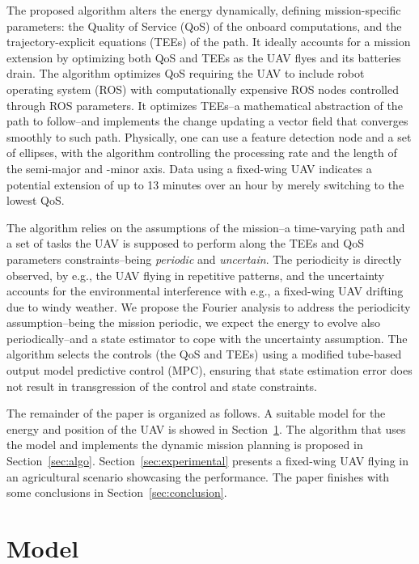 \documentclass[letterpaper,10pt,conference]{ieeeconf}
\begin{document}
The proposed algorithm alters the energy dynamically, defining mission-specific parameters: the Quality of Service (QoS) of the onboard computations, and the trajectory-explicit equations (TEEs) of the path. It ideally accounts for a mission extension by optimizing both QoS and TEEs as the UAV flyes and its batteries drain. The algorithm optimizes QoS requiring the UAV to include robot operating system (ROS) with computationally expensive ROS nodes controlled through ROS parameters. It optimizes TEEs--a mathematical abstraction of the path to follow--and implements the change updating a vector field that converges smoothly to such path. Physically, one can use a feature detection node and a set of ellipses, with the algorithm controlling the processing rate and the length of the semi-major and -minor axis. Data using a fixed-wing UAV indicates a potential extension of up to 13 minutes over an hour by merely switching to the lowest QoS.

The algorithm relies on the assumptions of the mission--a time-varying path and a set of tasks the UAV is supposed to perform along the TEEs and QoS parameters constraints--being \emph{periodic} and \emph{uncertain}. The periodicity is directly observed, by e.g., the UAV flying in repetitive patterns, and the uncertainty accounts for the environmental interference with e.g., a fixed-wing UAV drifting due to windy weather. We propose the Fourier analysis to address the periodicity assumption--being the mission periodic, we expect the energy to evolve also periodically--and a state estimator to cope with the uncertainty assumption. The algorithm selects the controls (the QoS and TEEs) using a modified tube-based output model predictive control (MPC), ensuring that state estimation error does not result in transgression of the control and state constraints.

The remainder of the paper is organized as follows. A suitable model for the energy and position of the UAV is showed in Section~\ref{sec:model}. The algorithm that uses the model and implements the dynamic mission planning is proposed in Section~\ref{sec:algo}. Section~\ref{sec:experimental} presents a fixed-wing UAV flying in an agricultural scenario showcasing the performance. The paper finishes with some conclusions in Section~\ref{sec:conclusion}.

\section{Model}
\label{sec:model}
\end{document}
